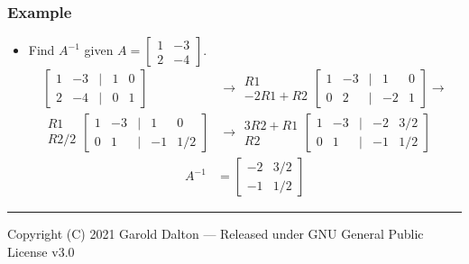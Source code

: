 \documentclass[14pt]{extarticle}
\begin{document}
\subsubsection{Example}
\begin{itemize}
	\item Find $A^{-1}$ given $A=\begin{bmatrix} 1 & -3 \\ 2 & -4	\end{bmatrix}$.
	\begin{align*}
		\begin{bmatrix}
			1 & -3 & | & 1 & 0 \\
			2 & -4 & | & 0 & 1
		\end{bmatrix} &\to
		\begin{array}{r}
			R1 \\
			-2R1 + R2
		\end{array}
		\begin{bmatrix}
			1 & -3 & | & 1 & 0 \\
			0 & 2 & | & -2 & 1
		\end{bmatrix} \to \\
		\begin{array}{r}
			R1 \\
			R2/2
		\end{array}
		\begin{bmatrix}
			1 & -3 & | & 1 & 0 \\
			0 & 1 & | & -1 & 1/2
		\end{bmatrix} &\to
		\begin{array}{r}
			3R2+R1 \\
			R2
		\end{array}
		\begin{bmatrix}
			1 & -3 & | & -2 & 3/2 \\
			0 & 1 & | & -1 & 1/2
		\end{bmatrix}
	\end{align*}
	\begin{align*}
		A^{-1} &= \begin{bmatrix} -2 & 3/2 \\ -1 & 1/2	\end{bmatrix}
	\end{align*}
\end{itemize}

\noindent\rule{\textwidth}{1pt}
{\footnotesize Copyright (C) 2021 Garold Dalton --- Released under GNU General Public License v3.0}
\end{document}
